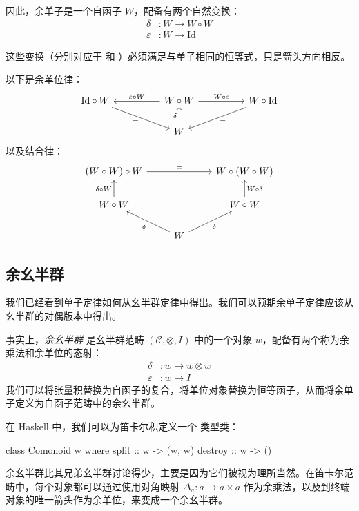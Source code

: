 \documentclass[DaoFP]{subfiles}
\begin{document}
因此，余单子是一个自函子 $W$，配备有两个自然变换：
\begin{align*}
\delta &\colon W \to W \circ W \\
\varepsilon &\colon W \to \text{Id} 
\end{align*}

这些变换（分别对应于  和 ）必须满足与单子相同的恒等式，只是箭头方向相反。

以下是余单位律：
\[
 \begin{tikzcd}
\text{Id} \circ W
 \arrow[rrd, "="']
& & W \circ W
 \arrow[ll, "\varepsilon \circ W"']
 \arrow[rr, "W \circ \varepsilon"]
&& W \circ \text{Id}
 \arrow[lld, "="]
 \\
 && W
  \arrow[u, "\delta"]
 \end{tikzcd}
\]
以及结合律：
\[
 \begin{tikzcd}
 (W \circ W) \circ W 
 \arrow[rr, "="]
 &&
 W \circ (W \circ W)
 \\
 W \circ W 
 \arrow[u, "\delta \circ W"]
& & W \circ W
 \arrow[u, "W \circ \delta"']
 \\
&  W
 \arrow[ul, "\delta"]
 \arrow[ur, "\delta"']
 \end{tikzcd}
\]

\subsection{余幺半群}

我们已经看到单子定律如何从幺半群定律中得出。我们可以预期余单子定律应该从幺半群的对偶版本中得出。

事实上，\emph{余幺半群} 是幺半群范畴 $(\mathcal{C}, \otimes, I)$ 中的一个对象 $w$，配备有两个称为余乘法和余单位的态射：
\begin{align*}
\delta &\colon w \to w \otimes w \\
\varepsilon &\colon w \to I
\end{align*}
我们可以将张量积替换为自函子的复合，将单位对象替换为恒等函子，从而将余单子定义为自函子范畴中的余幺半群。

在 Haskell 中，我们可以为笛卡尔积定义一个  类型类：
\begin{haskell}
class Comonoid w where
  split   :: w -> (w, w)
  destroy :: w -> ()
\end{haskell}

余幺半群比其兄弟幺半群讨论得少，主要是因为它们被视为理所当然。在笛卡尔范畴中，每个对象都可以通过使用对角映射 $\Delta_a \colon a \to a \times a$ 作为余乘法，以及到终端对象的唯一箭头作为余单位，来变成一个余幺半群。
\end{document}
